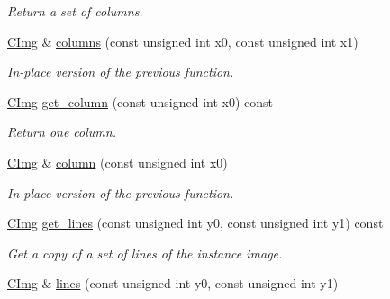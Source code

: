 \begin{DoxyCompactItemize}
\begin{DoxyCompactList}\small\item\em Return a set of columns. \end{DoxyCompactList}\item 
\hypertarget{structcimg__library_1_1_c_img_a8eccc5addf3a52ead3d21dfa44193e06}{\hyperlink{structcimg__library_1_1_c_img}{C\-Img} \& \hyperlink{structcimg__library_1_1_c_img_a8eccc5addf3a52ead3d21dfa44193e06}{columns} (const unsigned int x0, const unsigned int x1)}\label{structcimg__library_1_1_c_img_a8eccc5addf3a52ead3d21dfa44193e06}

\begin{DoxyCompactList}\small\item\em In-\/place version of the previous function. \end{DoxyCompactList}\item 
\hypertarget{structcimg__library_1_1_c_img_a935b82fb5ca9df5f120954480c83d75f}{\hyperlink{structcimg__library_1_1_c_img}{C\-Img} \hyperlink{structcimg__library_1_1_c_img_a935b82fb5ca9df5f120954480c83d75f}{get\-\_\-column} (const unsigned int x0) const }\label{structcimg__library_1_1_c_img_a935b82fb5ca9df5f120954480c83d75f}

\begin{DoxyCompactList}\small\item\em Return one column. \end{DoxyCompactList}\item 
\hypertarget{structcimg__library_1_1_c_img_a1fdbb6196417dc8083941372356c1617}{\hyperlink{structcimg__library_1_1_c_img}{C\-Img} \& \hyperlink{structcimg__library_1_1_c_img_a1fdbb6196417dc8083941372356c1617}{column} (const unsigned int x0)}\label{structcimg__library_1_1_c_img_a1fdbb6196417dc8083941372356c1617}

\begin{DoxyCompactList}\small\item\em In-\/place version of the previous function. \end{DoxyCompactList}\item 
\hypertarget{structcimg__library_1_1_c_img_a0d393319ea3287de4296a0fcb00d7ad6}{\hyperlink{structcimg__library_1_1_c_img}{C\-Img} \hyperlink{structcimg__library_1_1_c_img_a0d393319ea3287de4296a0fcb00d7ad6}{get\-\_\-lines} (const unsigned int y0, const unsigned int y1) const }\label{structcimg__library_1_1_c_img_a0d393319ea3287de4296a0fcb00d7ad6}

\begin{DoxyCompactList}\small\item\em Get a copy of a set of lines of the instance image. \end{DoxyCompactList}\item 
\hypertarget{structcimg__library_1_1_c_img_a2eccc05034e6f91bcb82aa0b1b580a25}{\hyperlink{structcimg__library_1_1_c_img}{C\-Img} \& \hyperlink{structcimg__library_1_1_c_img_a2eccc05034e6f91bcb82aa0b1b580a25}{lines} (const unsigned int y0, const unsigned int y1)}\label{structcimg__library_1_1_c_img_a2eccc05034e6f91bcb82aa0b1b580a25}


\end{DoxyCompactItemize}
